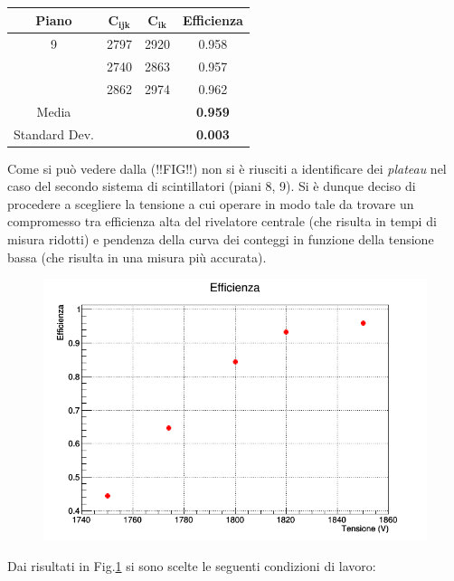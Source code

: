 \documentclass[11pt]{article}
\begin{document}
\begin{tabular}{|c|c|c|c|}
\hline 
\textbf{Piano} & $\mathbf{C_{ijk}}$ & $\mathbf{C_{ik}}$ & \textbf{Efficienza} \\
\hline 
9 & 2797 & 2920 & 0.958 \\ 
\hline 
\hphantom & 2740 & 2863 & 0.957 \\ 
\hline 
\hphantom & 2862 & 2974 & 0.962 \\ 
\hline 
Media & \hphantom & \hphantom & \textbf{0.959} \\ 
\hline 
Standard Dev. & \hphantom & \hphantom & \textbf{0.003} \\ 
\hline 
\end{tabular} 
\vspace{0.8 cm}

Come si può vedere dalla (!!FIG!!) non si è riusciti a identificare dei \textit{plateau} nel caso del secondo sistema di scintillatori (piani 8, 9). Si è dunque deciso di procedere a scegliere la tensione a cui operare in modo tale da trovare un compromesso tra efficienza alta del rivelatore centrale (che risulta in tempi di misura ridotti) e pendenza della curva dei conteggi in funzione della tensione bassa (che risulta in una misura più accurata). 

\begin{center}
\begin{figure}
\includegraphics[width=\textwidth]{"eff_tens"}
\label{fig:eff_tens}
\end{figure}
\end{center}

Dai risultati in Fig.\ref{fig:eff_tens} si sono scelte le seguenti condizioni di lavoro:
\end{document}
